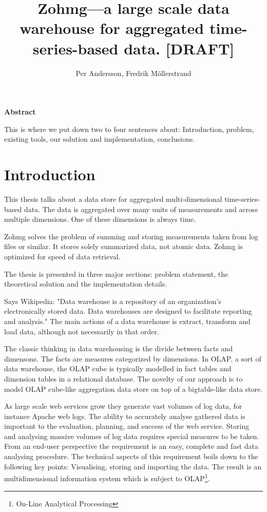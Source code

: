 \documentclass[a4paper,10pt]{book}
\author{Per Andersson, Fredrik M{\"o}llerstrand}
\title{Zohmg---a large scale data warehouse for aggregated time-series-based
data. [DRAFT]}
\begin{document}
\maketitle



\noindent \Large{\textbf{Abstract}}

\vspace{12pt}

\noindent This is where we put down two to four sentences about:
Introduction, problem, existing tools, our solution and implementation,
conclusions.


\tableofcontents

\vfill

\pagebreak



\chapter{Introduction}

This thesis talks about a data store for aggregated multi-dimensional time-series-based data. The data is aggregated over many units of measurements and across multiple dimensions. One of these dimensions is always time.

Zohmg solves the problem of summing and storing measurements taken from log files or similar. It stores solely summarized data, not atomic data. Zohmg is optimized for speed of data retrieval.

The thesis is presented in three major sections: problem statement, the theoretical solution and the implementation details.

Says Wikipedia: "Data warehouse is a repository of an organization's electronically stored data. Data warehouses are designed to facilitate reporting and analysis." The main actions of a data warehouse is extract, transform and load data, although not necessarily in that order.

The classic thinking in data warehousing is the divide between facts and dimensons. The facts are measures categorized by dimensions. In OLAP, a sort of data warehouse, the OLAP cube is typically modelled in fact tables and dimension tables in a relational database. The novelty of our approach is to model OLAP cube-like aggregation data store on top of a bigtable-like data store.


As large scale web services grow they generate vast volumes of log data,
for instance Apache web logs. The ability to accurately analyse gathered
data is important to the evaluation, planning, and success of the web
service. Storing and analysing massive volumes of log data requires
special measures to be taken. From an end-user perspective the requirement
is an easy, complete and fast data analysing procedure. The technical
aspects of this requirement boils down to the following key points:
Visualising, storing and importing the data. The result is an
multidimensional information system which is subject to
OLAP\footnote{On-Line Analytical Processing}. \cite{olap_solutions}
\end{document}
